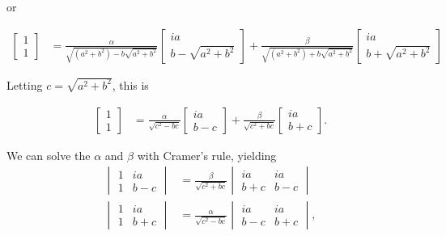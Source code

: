 or

\begin{align}\label{eqn:desaiCh5:207}
\begin{bmatrix}
1 \\
1
\end{bmatrix}
&=
\frac{\alpha}{\sqrt{(a^2 + b^2) - b \sqrt{a^2 + b^2}}}
\begin{bmatrix}
i a \\
b - \sqrt{a^2 + b^2}
\end{bmatrix}
+\frac{\beta}{\sqrt{(a^2 + b^2) + b \sqrt{a^2 + b^2}}}
\begin{bmatrix}
i a \\
b + \sqrt{a^2 + b^2}
\end{bmatrix}
\end{align}

Letting $c = \sqrt{a^2 + b^2}$, this is

\begin{align}\label{eqn:desaiCh5:208}
\begin{bmatrix}
1 \\
1
\end{bmatrix}
&=
\frac{\alpha}{\sqrt{c^2 - b c}}
\begin{bmatrix}
i a \\
b - c
\end{bmatrix}
+\frac{\beta}{\sqrt{c^2 + b c}}
\begin{bmatrix}
i a \\
b + c
\end{bmatrix}.
\end{align}

We can solve the $\alpha$ and $\beta$ with Cramer's rule, yielding
\begin{align*}
\begin{vmatrix}
1 & i a \\
1 & b - c
\end{vmatrix}
&=
\frac{\beta}{\sqrt{c^2 + b c}}
\begin{vmatrix}
i a  & i a \\
b + c & b - c
\end{vmatrix} \\
\begin{vmatrix}
1 & i a \\
1 & b + c
\end{vmatrix}
&=
\frac{\alpha}{\sqrt{c^2 - b c}}
\begin{vmatrix}
i a  & i a \\
b - c & b + c
\end{vmatrix},
\end{align*}

